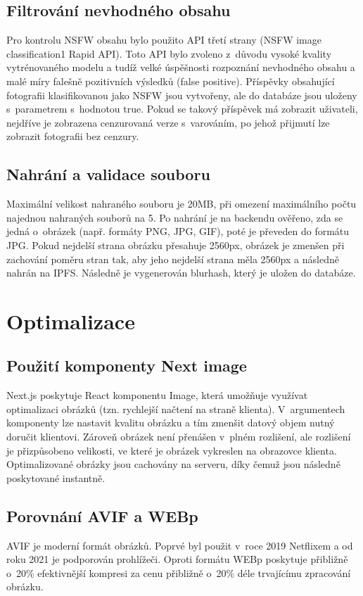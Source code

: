 \documentclass[12pt, a4paper,
  oneside,      %
]{report}
\begin{document}
\subsection{Filtrování nevhodného obsahu}\label{section:nsfw_filter}
Pro kontrolu NSFW obsahu bylo použito API třetí strany (NSFW image classification1 Rapid API). Toto API bylo zvoleno z~důvodu vysoké kvality vytrénovaného modelu a tudíž velké úspěšnosti rozpoznání nevhodného obsahu a malé míry falešně pozitivních výsledků (false positive). Příspěvky obsahující fotografii klasifikovanou jako NSFW jsou vytvořeny, ale do databáze jsou uloženy s~parametrem  s~hodnotou true. Pokud se takový příspěvek má zobrazit uživateli, nejdříve je zobrazena cenzurovaná verze s~varováním, po jehož přijmutí lze zobrazit fotografii bez cenzury.

\subsection{Nahrání a validace souboru} Maximální velikost nahraného souboru je 20MB, při omezení maximálního počtu najednou nahraných souborů na 5.  Po nahrání je na backendu ověřeno, zda se jedná o~obrázek (např. formáty PNG, JPG, GIF), poté je převeden do formátu JPG. Pokud nejdelší strana obrázku přesahuje 2560px, obrázek je zmenšen při zachování poměru stran tak, aby jeho nejdelší strana měla 2560px a následně nahrán na IPFS. Následně je vygenerován blurhash, který je uložen do databáze.
\section{Optimalizace}
\subsection{Použití komponenty Next image}   \label{subsubsection:nextImageComponent}
Next.js poskytuje React komponentu Image, která umožňuje využívat optimalizaci obrázků (tzn. rychlejší načtení na straně klienta). V~argumentech komponenty lze nastavit kvalitu obrázku a tím zmenšit datový objem nutný doručit klientovi. Zároveň obrázek není přenášen v~plném rozlišení, ale rozlišení je přizpůsobeno velikosti, ve které je obrázek vykreslen na obrazovce klienta. Optimalizované obrázky jsou cachovány na serveru, díky čemuž jsou následně poskytované instantně. \cite{nextImage}
\subsection{Porovnání AVIF a WEBp}
AVIF je moderní formát obrázků. Poprvé byl použit v~roce 2019 Netflixem a od roku 2021 je podporován prohlížeči. Oproti formátu WEBp poskytuje přibližně o~20\% efektivnější kompresi za cenu přibližně o~20\% déle trvajícímu zpracování obrázku.
\end{document}

